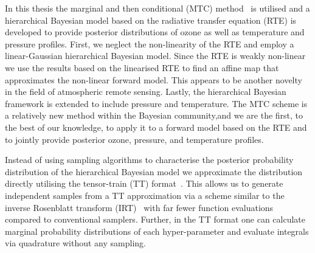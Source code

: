 In this thesis the marginal and then conditional (MTC) method~\cite{fox2016fast} is utilised and a hierarchical Bayesian model based on the radiative transfer equation (RTE) is developed to provide posterior distributions of ozone as well as temperature and pressure profiles.
First, we neglect the non-linearity of the RTE and employ a linear-Gaussian hierarchical Bayesian model.
Since the RTE is weakly non-linear we use the results based on the linearised RTE to find an affine map that approximates the non-linear forward model.
This appears to be another novelty in the field of atmospheric remote sensing.
Lastly, the hierarchical Bayesian framework is extended to include pressure and temperature.
The MTC scheme is a relatively new method within the Bayesian community,and we are the first, to the best of our knowledge, to apply it to a forward model based on the RTE and to jointly provide posterior ozone, pressure, and temperature profiles.

Instead of using sampling algorithms to characterise the posterior probability distribution of the hierarchical Bayesian model we approximate the distribution directly utilising the tensor-train (TT) format~\cite{cui2022deep}. 
This allows us to generate independent samples from a TT approximation via a scheme similar to the inverse Rosenblatt transform (IRT)~\cite{dolgov2020approximation} with far fewer function evaluations compared to conventional samplers.
Further, in the TT format one can calculate marginal probability distributions of each hyper-parameter and evaluate integrals via quadrature without any sampling.



